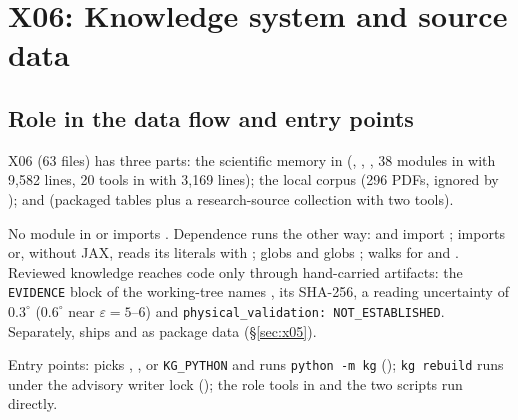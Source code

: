 \section{X06: Knowledge system and source data}\label{sec:x06}

\subsection{Role in the data flow and entry points}
X06 (63 files) has three parts: the scientific memory in  (, , , 38 modules in  with 9{,}582 lines, 20 tools in  with 3{,}169 lines); the local corpus  (296 PDFs, ignored by ); and  (packaged tables plus a research-source collection with two tools).

No module in  or  imports . Dependence runs the other way:  and  import ;  imports  or, without JAX, reads its literals with ;  globs  and  globs ;  walks  for  and . Reviewed knowledge reaches code only through hand-carried artifacts: the \texttt{EVIDENCE} block of the working-tree  names , its SHA-256, a reading uncertainty of $0.3^\circ$ ($0.6^\circ$ near $\varepsilon=5$--6) and \texttt{physical\_validation: NOT\_ESTABLISHED}. Separately,  ships  and  as package data (\S\ref{sec:x05}).

Entry points:  picks , ,  or \texttt{KG\_PYTHON} and runs \texttt{python -m kg} (); \texttt{kg rebuild} runs  under the advisory writer lock (); the role tools in  and the two  scripts run directly.

